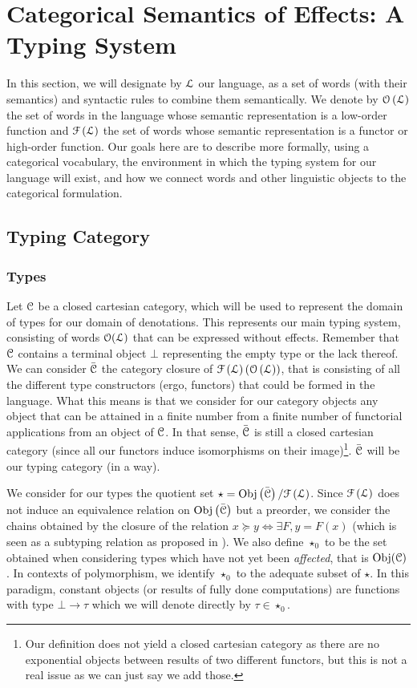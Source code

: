 \section{Categorical Semantics of Effects: A Typing System}
\label{sec:typingsystem}
In this section, we will designate by $\mathcal{L}$ our language, as a set of words
(with their semantics) and syntactic rules to combine them semantically.
We denote by $\mathcal{O}\left( \mathcal{L} \right)$ the set of words in the language whose
semantic representation is a low-order function and $\mathcal{F}\left( \mathcal{L} \right)$ the
set of words whose semantic representation is a functor or high-order function.
Our goals here are to describe more formally, using a categorical vocabulary,
the environment in which the typing system for our language will exist, and how
we connect words and other linguistic objects to the categorical formulation.

\subsection{Typing Category}\label{subsec:typingcategory}
\subsubsection{Types}\label{subsubsec:types}
Let $\mathcal{C}$ be a closed cartesian category, which will be used to represent the
domain of types for our domain of denotations.
This represents our main typing system, consisting of words $\mathcal{O}(\mathcal{L})$ that can
be expressed without effects.
Remember that $\mathcal{C}$ contains a terminal object $\bot$ representing the empty
type or the lack thereof.
We can consider $\bar{\mathcal{C}}$ the category closure of
$\mathcal{F}\left( \mathcal{L} \right)\left(\mathcal{O}\left( \mathcal{L} \right)\right)$, that is consisting of
all the different type constructors (ergo, functors) that could be formed in
the language.
What this means is that we consider for our category objects any object that
can be attained in a finite number from a finite number of functorial
applications from an object of $\mathcal{C}$.
In that sense, $\bar{\mathcal{C}}$ is still a closed cartesian category (since all our
functors induce isomorphisms on their image)\footnote{Our definition does not
	yield a closed cartesian category as there are no exponential objects between
	results of two different functors, but this is not a real issue as we can just
	say we add those.}.
$\bar{\mathcal{C}}$ will be our typing category (in a way).

We consider for our types the quotient set
$\star = \mathrm{Obj}\left( \bar{\mathcal{C}} \right)/\mathcal{F}\left( \mathcal{L} \right)$.
Since $\mathcal{F}\left( \mathcal{L} \right)$ does not induce an equivalence relation on
$\operatorname{Obj}\left( \bar{\mathcal{C}} \right)$ but a preorder, we consider the chains obtained
by the closure of the relation $x\succeq y \Leftrightarrow \exists F, y = F(x)$
(which is seen as a subtyping relation as proposed in
\cite{melliesFunctorsAreType2015}).
We also define $\star_{0}$ to be the set obtained when considering types which
have not yet been \emph{affected}, that is $\operatorname{Obj}(\mathcal{C})$.
In contexts of polymorphism, we identify $\star_{0}$ to the adequate subset of
$\star$.
In this paradigm, constant objects (or results of fully done computations) are
functions with type $\bot \to \tau$ which we will denote directly by
$\tau \in \star_{0}$.

